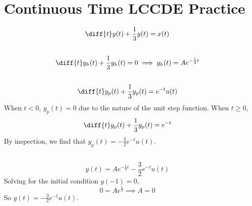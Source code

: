 \documentclass{article}
\begin{document}
\section{Continuous Time LCCDE Practice}

\begin{equation}
    \diff{t} y(t) + \frac{1}{3} y(t) = x(t)
\end{equation}

\subsection{}

\begin{equation}
    \diff{t} y_h(t) + \frac{1}{3} y_h(t) = 0 \implies y_h(t) = A e^{-\frac{1}{3} t}
\end{equation}

\subsection{}

\begin{equation}
    \diff{t} y_p(t) + \frac{1}{3} y_p(t) = e^{-t} u(t)
\end{equation}
When \(t < 0\), \(y_p(t) = 0\) due to the nature of the unit step function.
When \(t \geqslant 0\),
\begin{equation}
    \diff{t} y_p(t) + \frac{1}{3} y_p(t) = e^{-t}
\end{equation}
By inspection, we find that \(y_p(t) = -\frac{3}{2} e^{-t} u(t)\).

\subsection{}

\begin{equation}
    y(t) = A e^{-\frac{1}{3}t} - \frac{3}{2} e^{-t} u(t)
\end{equation}
Solving for the initial condition \(y(-1) = 0\),
\begin{equation}
    0 = A e^{\frac{1}{3}} \implies A = 0
\end{equation}
So \(y(t) = -\frac{3}{2} e^{-t} u(t)\).

\subsection{}
\end{document}

